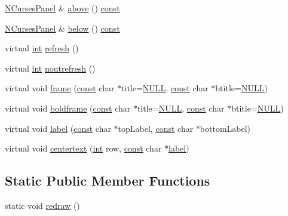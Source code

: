 \begin{DoxyCompactItemize}
\item 
\hyperlink{class_n_curses_panel}{N\-Curses\-Panel} \& \hyperlink{class_n_curses_panel_a16c0b8b37ec9c400d1b7a3c3d0550454}{above} () \hyperlink{term__entry_8h_a57bd63ce7f9a353488880e3de6692d5a}{const} 
\item 
\hyperlink{class_n_curses_panel}{N\-Curses\-Panel} \& \hyperlink{class_n_curses_panel_a436ab34c13b42f3208bbb38370cf9c7b}{below} () \hyperlink{term__entry_8h_a57bd63ce7f9a353488880e3de6692d5a}{const} 
\item 
virtual \hyperlink{term__entry_8h_ad65b480f8c8270356b45a9890f6499ae}{int} \hyperlink{class_n_curses_panel_a66ce8d1e6c3d06e2c718d86c1bd5a819}{refresh} ()
\item 
virtual \hyperlink{term__entry_8h_ad65b480f8c8270356b45a9890f6499ae}{int} \hyperlink{class_n_curses_panel_a00eda5edb018034e94cd44ec8fbfa21e}{noutrefresh} ()
\item 
virtual void \hyperlink{class_n_curses_panel_a08e5195776cb5fdfc612b830d138d4a2}{frame} (\hyperlink{term__entry_8h_a57bd63ce7f9a353488880e3de6692d5a}{const} char $\ast$title=\hyperlink{internal_8h_a070d2ce7b6bb7e5c05602aa8c308d0c4}{N\-U\-L\-L}, \hyperlink{term__entry_8h_a57bd63ce7f9a353488880e3de6692d5a}{const} char $\ast$btitle=\hyperlink{internal_8h_a070d2ce7b6bb7e5c05602aa8c308d0c4}{N\-U\-L\-L})
\item 
virtual void \hyperlink{class_n_curses_panel_af4833c44d22b3a0296034fe8cee91541}{boldframe} (\hyperlink{term__entry_8h_a57bd63ce7f9a353488880e3de6692d5a}{const} char $\ast$title=\hyperlink{internal_8h_a070d2ce7b6bb7e5c05602aa8c308d0c4}{N\-U\-L\-L}, \hyperlink{term__entry_8h_a57bd63ce7f9a353488880e3de6692d5a}{const} char $\ast$btitle=\hyperlink{internal_8h_a070d2ce7b6bb7e5c05602aa8c308d0c4}{N\-U\-L\-L})
\item 
virtual void \hyperlink{class_n_curses_panel_a43566536587c89baa2b67854eac1b039}{label} (\hyperlink{term__entry_8h_a57bd63ce7f9a353488880e3de6692d5a}{const} char $\ast$top\-Label, \hyperlink{term__entry_8h_a57bd63ce7f9a353488880e3de6692d5a}{const} char $\ast$bottom\-Label)
\item 
virtual void \hyperlink{class_n_curses_panel_a28d157c45f2b93430f2f5a679676a815}{centertext} (\hyperlink{term__entry_8h_ad65b480f8c8270356b45a9890f6499ae}{int} row, \hyperlink{term__entry_8h_a57bd63ce7f9a353488880e3de6692d5a}{const} char $\ast$\hyperlink{class_n_curses_panel_a43566536587c89baa2b67854eac1b039}{label})
\end{DoxyCompactItemize}
\subsection*{Static Public Member Functions}
\begin{DoxyCompactItemize}
\item 
static void \hyperlink{class_n_curses_panel_ac0f4b193d17000be48af4d062a2a236e}{redraw} ()
\end{DoxyCompactItemize}
